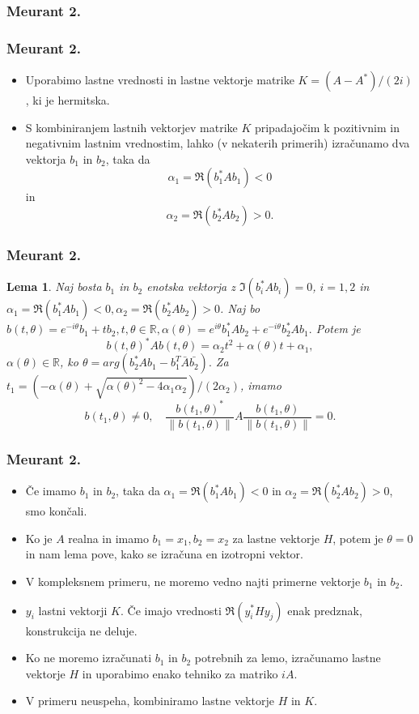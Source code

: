 \documentclass{beamer}
\newcommand{\norm}[1]{\left\lVert#1\right\rVert}
\newcommand{\R}{\mathbb R}
\newtheorem{lema}[izrek]{Lema}
\begin{document}
\subsubsection{Meurant 2.}
\begin{frame}
\frametitle{Meurant 2.}
\begin{itemize}
\item Uporabimo lastne vrednosti in lastne vektorje matrike $K=(A-A^\ast)/(2i)$, ki je hermitska. 
\item S kombiniranjem lastnih vektorjev matrike $K$ pripadajočim k pozitivnim in negativnim lastnim vrednostim, lahko (v nekaterih primerih) izračunamo dva vektorja $b_1$ in $b_2$, taka da $$\alpha_1=\Re(b_1^\ast Ab_1)<0$$ in $$\alpha_2=\Re(b_2^\ast Ab_2)>0.$$
\end{itemize}
\end{frame}
\begin{frame}
\frametitle{Meurant 2.}
\begin{lema}\label{komp}
Naj bosta $b_1$ in $b_2$ enotska vektorja z $\Im(b_i^\ast Ab_i)=0$, $i=1,2$ in $\alpha_1=\Re(b_1^\ast Ab_1)<0, \alpha_2=\Re(b_2^\ast Ab_2)>0$. Naj bo $b(t,\theta)=e^{-i\theta}b_1 + tb_2, t,\theta \in \R, \alpha(\theta)=e^{i\theta}b_1^\ast Ab_2 +e^{-i\theta}b_2^\ast Ab_1.$ Potem je 
$$b(t,\theta)^\ast Ab(t,\theta)=\alpha_2 t^2 +\alpha(\theta)t+\alpha_1,$$ 
$\alpha(\theta)\in\R$, ko $\theta=arg(b_2^\ast Ab_1 -b_1^T\bar{A}\bar{b_2}).$ Za $t_1 =(-\alpha(\theta) +\sqrt{\alpha(\theta)^2 -4\alpha_1\alpha_2})/(2\alpha_2)$, imamo 
$$b(t_1, \theta) \not=0,\quad  \frac{b(t_1,\theta)^\ast}{\norm{b(t_1,\theta)}}A\frac{b(t_1,\theta)}{\norm{b(t_1,\theta)}}=0.$$
\end{lema}
\end{frame}
\begin{frame}
\frametitle{Meurant 2.}
\begin{itemize}
\item  Če imamo $b_1$ in $b_2$, taka da  $\alpha_1=\Re(b_1^\ast Ab_1)<0$ in $\alpha_2=\Re(b_2^\ast Ab_2)>0$, smo končali.
\item  Ko je $A$ realna in imamo $b_1=x_1, b_2=x_2$ za lastne vektorje $H$, potem je $\theta=0$ in nam lema pove, kako se izračuna en izotropni vektor.
\item  V kompleksnem primeru, ne moremo vedno najti primerne vektorje $b_1$ in $b_2$.
\item $y_i$ lastni vektorji $K$. Če imajo vrednosti $\Re(y_i^\ast Hy_j)$ enak predznak, konstrukcija ne deluje.
\item Ko ne moremo izračunati $b_1$ in $b_2$ potrebnih za lemo, izračunamo lastne vektorje $H$ in uporabimo enako tehniko za matriko $iA$. 
\item V primeru neuspeha, kombiniramo lastne vektorje $H$ in $K$.
\end{itemize}
\end{frame}
\end{document}
